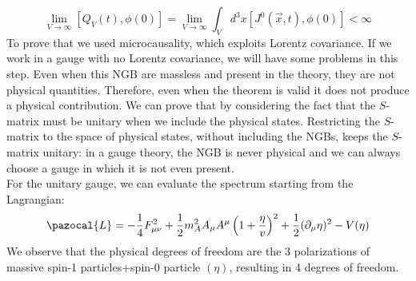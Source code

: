 \documentclass[../main.tex]{subfiles}
\begin{document}
\[
\lim_{V\to\infty}[Q_V(t),\phi(0)]=\lim_{V\to\infty}\int_Vd^3x[J^0(\Vec{x},t),\phi(0)]<\infty
\]
To prove that we used microcausality, which exploits Lorentz covariance. If we work in a gauge with no Lorentz covariance, we will have some problems in this step. Even when this NGB are massless and present in the theory, they are not physical quantities. Therefore, even when the theorem is valid it does not produce a physical contribution. We can prove that by considering the fact that the $S$-matrix must be unitary when we include the physical states. Restricting the $S$-matrix to the space of physical states, without including the NGBs, keeps the $S$-matrix unitary: in a gauge theory, the NGB is never physical and we can always choose a gauge in which it is not even present.\\
For the unitary gauge, we can evaluate the spectrum starting from the Lagrangian:
\[
\pazocal{L}=-\frac{1}{4}F_{\mu\nu}^2+\frac{1}{2}m_A^2A_\mu A^\mu\left(1+\frac{\eta}{v}\right)^2+\frac{1}{2}(\partial_\mu\eta)^2-V(\eta)
\]
We observe that the physical degrees of freedom are the 3 polarizations of massive spin-1 particles+spin-0 particle $(\eta)$, resulting in 4 degrees of freedom.
\end{document}
